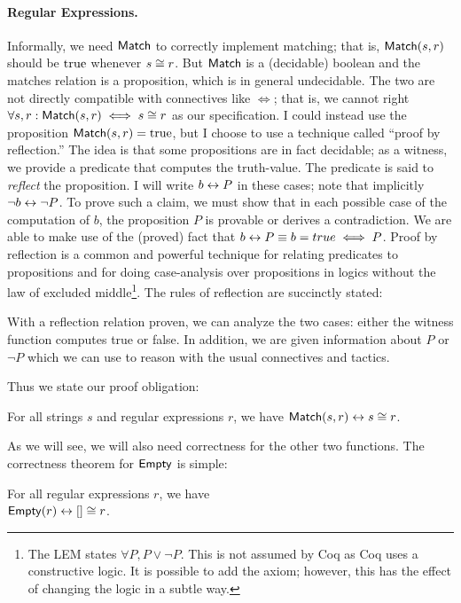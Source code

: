 \paragraph{Regular Expressions.} Informally, we need \(\mathsf{Match}\) to
correctly implement matching; that is, \(\mathsf{Match}(s, r)\) should be
\(\operatorname{true}\) whenever \(s \mathrel{\cong} r\). But \(\mathsf{Match}\) is a (decidable)
boolean and the matches relation is a proposition, which is in general
undecidable. The two are not directly compatible with connectives like \(\iff\);
that is, we cannot right \(\forall s, r: \mathsf{Match}(s, r) \iff s \mathrel{\cong} r\)
as our specification. I could instead use the proposition \(\mathsf{Match}(s, r) =
\operatorname{true}\), but I choose to use a technique called ``proof by reflection.'' The
idea is that some propositions are in fact decidable; as a witness, we provide a
predicate that computes the truth-value. The predicate is said to \emph{reflect}
the proposition. I will write \(b \mathrel{\leftrightarrow} P\) in these cases; note that
implicitly \(\neg b \mathrel{\leftrightarrow} \neg P\). To prove such a claim, we must show that
in each possible case of the computation of \(b\), the proposition \(P\) is
provable or derives a contradiction. We are able to make use of the (proved)
fact that \(b \mathrel{\leftrightarrow} P \equiv b = true \iff P\). Proof by reflection is a
common and powerful technique for relating predicates to propositions and for
doing case-analysis over propositions in logics without the law of excluded
middle\footnote{The LEM states \(\forall P, P \lor \neg P\). This is not assumed
by Coq as Coq uses a constructive logic. It is possible to add the axiom;
however, this has the effect of changing the logic in a subtle way.}. The rules
of reflection are succinctly stated:
With a reflection relation proven, we can analyze the two cases: either the
witness function computes true or false. In addition, we are given information
about \(P\) or \(\neg P\) which we can use to reason with the usual connectives
and tactics.

Thus we state our proof obligation:
\begin{thm}\label{Th:r_match}
    For all strings \(s\) and regular expressions \(r\), we have
    \(\mathsf{Match}(s, r) \mathrel{\leftrightarrow} s \mathrel{\cong} r\).
\end{thm}

As we will see, we will also need correctness for the other two functions. The
correctness theorem for \(\mathsf{Empty}\) is simple:
\begin{lem}\label{Lem:r_empty}
    For all regular expressions \(r\), we have \\
    \(\mathsf{Empty}(r) \mathrel{\leftrightarrow} [] \mathrel{\cong} r\).
\end{lem}

